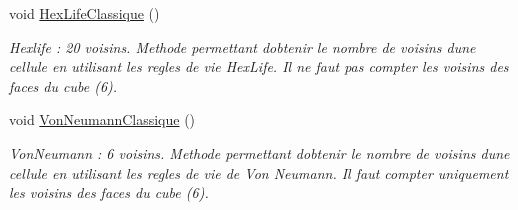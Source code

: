 \begin{DoxyCompactItemize}
void \mbox{\hyperlink{class_simulation_a20934920a4fc75fa258a85d0c4e6968e}{Hex\+Life\+Classique}} ()
\begin{DoxyCompactList}\small\item\em Hexlife \+: 20 voisins. Methode permettant d\textquotesingle{}obtenir le nombre de voisins d\textquotesingle{}une cellule en utilisant les regles de vie Hex\+Life. Il ne faut pas compter les voisins des faces du cube (6). \end{DoxyCompactList}\item 
void \mbox{\hyperlink{class_simulation_a8b95cd2e9f897c0dab40119ac1c54f39}{Von\+Neumann\+Classique}} ()
\begin{DoxyCompactList}\small\item\em Von\+Neumann \+: 6 voisins. Methode permettant d\textquotesingle{}obtenir le nombre de voisins d\textquotesingle{}une cellule en utilisant les regles de vie de Von Neumann. Il faut compter uniquement les voisins des faces du cube (6). \end{DoxyCompactList}\end{DoxyCompactItemize}
